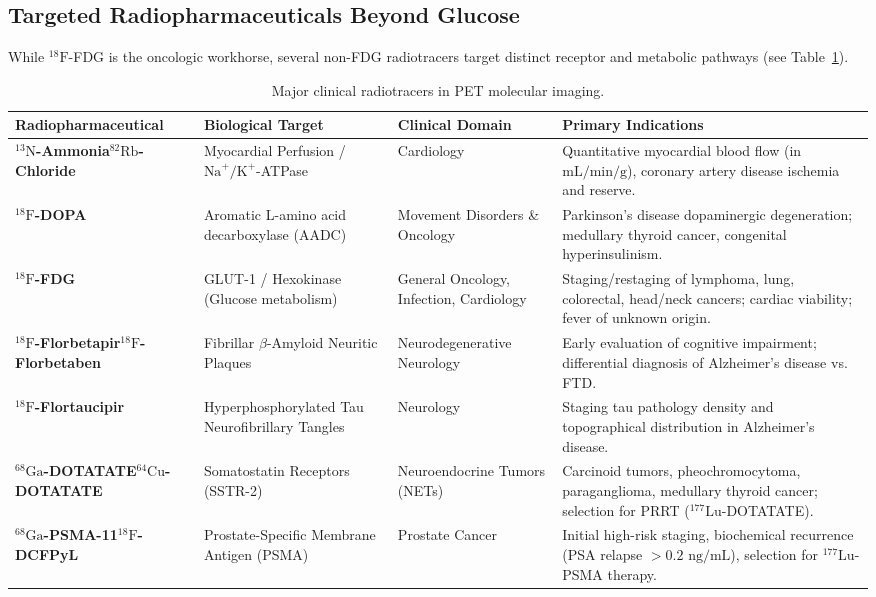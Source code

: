 \documentclass[11pt,a4paper]{article}
\begin{document}
\subsection{Targeted Radiopharmaceuticals Beyond Glucose}
While $^{18}\text{F}$-FDG is the oncologic workhorse, several non-FDG radiotracers target distinct receptor and metabolic pathways (see Table~\ref{tab:radiotracers}).

\begin{table}[htbp]
\centering
\small
\renewcommand{\arraystretch}{1.25}
\begin{tabular}{p{3.5cm}p{3.2cm}p{3cm}p{5.5cm}}
\toprule
\textbf{Radiopharmaceutical} & \textbf{Biological Target} & \textbf{Clinical Domain} & \textbf{Primary Indications} \\
\midrule
\textbf{$^{13}\text{N}$-Ammonia}\newline \textbf{$^{82}\text{Rb}$-Chloride} & Myocardial Perfusion / $\text{Na}^+/\text{K}^+$-ATPase & Cardiology & Quantitative myocardial blood flow (in $\text{mL/min/g}$), coronary artery disease ischemia and reserve. \\
\textbf{$^{18}\text{F}$-DOPA} & Aromatic L-amino acid decarboxylase (AADC) & Movement Disorders \& Oncology & Parkinson's disease dopaminergic degeneration; medullary thyroid cancer, congenital hyperinsulinism. \\
\textbf{$^{18}\text{F}$-FDG} & GLUT-1 / Hexokinase (Glucose metabolism) & General Oncology, Infection, Cardiology & Staging/restaging of lymphoma, lung, colorectal, head/neck cancers; cardiac viability; fever of unknown origin. \\
\textbf{$^{18}\text{F}$-Florbetapir}\newline \textbf{$^{18}\text{F}$-Florbetaben} & Fibrillar $\beta$-Amyloid Neuritic Plaques & Neurodegenerative Neurology & Early evaluation of cognitive impairment; differential diagnosis of Alzheimer's disease vs. FTD. \\
\textbf{$^{18}\text{F}$-Flortaucipir} & Hyperphosphorylated Tau Neurofibrillary Tangles & Neurology & Staging tau pathology density and topographical distribution in Alzheimer's disease. \\
\textbf{$^{68}\text{Ga}$-DOTATATE}\newline \textbf{$^{64}\text{Cu}$-DOTATATE} & Somatostatin Receptors (SSTR-2) & Neuroendocrine Tumors (NETs) & Carcinoid tumors, pheochromocytoma, paraganglioma, medullary thyroid cancer; selection for PRRT ($^{177}\text{Lu}$-DOTATATE). \\
\textbf{$^{68}\text{Ga}$-PSMA-11}\newline \textbf{$^{18}\text{F}$-DCFPyL} & Prostate-Specific Membrane Antigen (PSMA) & Prostate Cancer & Initial high-risk staging, biochemical recurrence (PSA relapse $>0.2\text{ ng/mL}$), selection for $^{177}\text{Lu}$-PSMA therapy. \\
\bottomrule
\end{tabular}
\caption{Major clinical radiotracers in PET molecular imaging.}
\label{tab:radiotracers}
\end{table}
\end{document}
